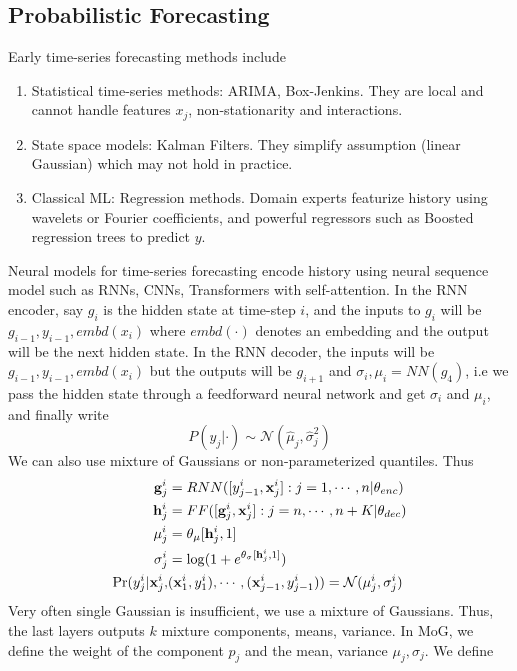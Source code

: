 \subsection{Probabilistic Forecasting}
Early time-series forecasting methods include
\begin{enumerate}
	\item Statistical time-series methods: ARIMA, Box-Jenkins. They are local and cannot handle features $x_j$, non-stationarity and interactions.
	\item State space models: Kalman Filters. They simplify assumption (linear Gaussian) which may not hold in practice.
	\item Classical ML: Regression methods. Domain experts featurize history using wavelets or Fourier coefficients, and powerful regressors such as Boosted regression trees to predict $y$.
\end{enumerate}
Neural models for time-series forecasting encode history using neural sequence model such as RNNs, CNNs, Transformers with self-attention. In the RNN encoder, say $g_i$ is the hidden state at time-step $i$, and the inputs to $g_i$ will be $g_{i-1}, y_{i-1}, embd(x_i)$ where $embd(\cdot)$ denotes an embedding and the output will be the next hidden state. In the RNN decoder, the inputs will be $g_{i-1}, y_{i-1}, embd(x_i)$ but the outputs will be $g_{i+1}$ and $\sigma_i, \mu_i = NN(g_4)$, i.e we pass the hidden state through a feedforward neural network and get $\sigma_i$ and $\mu_i$, and finally write
\begin{equation}
	P(y_j | \cdot) \sim \mathcal{N}(\widehat{\mu}_j, \widehat{\sigma}^2_j)
\end{equation}
We can also use mixture of Gaussians or non-parameterized quantiles. Thus
\begin{align}
	\mathbf{g}_j^i &= RNN([y_{j-1}^i, \mathbf{x}_j^i]:j=1,\cdots,n|\theta_{enc}) \\
	\mathbf{h}_j^i &= FF([\mathbf{g}_j^i, \mathbf{x}_j^i]: j=n, \cdots, n+K | \theta_{dec}) \\
	\mu_j^i &= \theta_\mu[\mathbf{h}_j^i, 1] \\
	\sigma_j^i &= \log(1 + e^{\theta_\sigma[\mathbf{h}_j^i, 1]}) \\
	\text{Pr}(y_j^i | \mathbf{x}_j^i, &(\mathbf{x}_1^i, y_1^i), \cdots, (\mathbf x_{j-1}^i, y_{j-1}^i)) = \mathcal{N}(\mu_j^i, \sigma_j^i)
\end{align}
Very often single Gaussian is insufficient, we use a mixture of Gaussians. Thus, the last layers outputs $k$ mixture components, means, variance. In MoG, we define the weight of the component $p_j$ and the mean, variance $\mu_j, \sigma_j$. We define 
